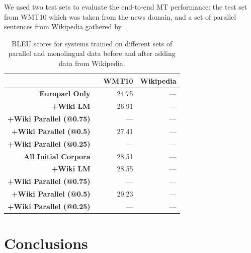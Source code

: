 We used two test sets to evaluate the end-to-end MT performance: the test set
from WMT10 which was taken from the news domain, and a set of parallel sentences
from Wikipedia gathered by \citep{Smith10}.

\begin{table}[ht]
\begin{center}
\begin{tabular}{|r||r|r|}
\hline
      & WMT10        & Wikipedia \\
\hline
\textbf{Europarl Only} \
      & 24.75       & ---    \\
\textbf{+Wiki LM} \
      & 26.91       & ---    \\
\textbf{+Wiki Parallel (@0.75)} \
      & ---       & ---    \\
\textbf{+Wiki Parallel (@0.5)} \
      & 27.41       & ---    \\
\textbf{+Wiki Parallel (@0.25)} \
      & ---       & ---    \\
\hline
\textbf{All Initial Corpora} \
      & 28.51       & ---    \\
\textbf{+Wiki LM} \
      & 28.55       & ---    \\
\textbf{+Wiki Parallel (@0.75)} \
      & ---       & ---    \\
\textbf{+Wiki Parallel (@0.5)} \
      & 29.23       & ---    \\
\textbf{+Wiki Parallel (@0.25)} \
      & ---       & ---    \\
\hline
\end{tabular}
\end{center}
\caption{BLEU scores for systems trained on different sets of parallel and
monolingual data before and after adding data from Wikipedia.}
\label{table:esen_bleu}
\end{table}

\section{Conclusions}
